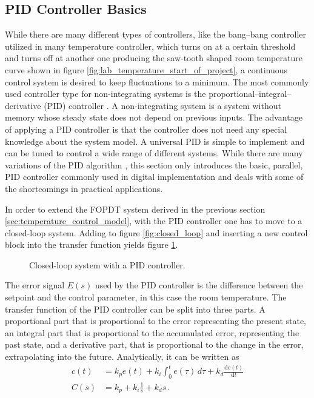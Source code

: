 \subsection{PID Controller Basics}%
\label{sec:pid_controller_basics}
While there are many different types of controllers, like the bang–bang controller utilized in many temperature controller, which turns on at a certain threshold and turns off at another one producing the saw-tooth shaped room temperature curve shown in figure \ref{fig:lab_temperature_start_of_project}, a continuous control system is desired to keep fluctuations to a minimum. The most commonly used controller type for non-integrating systems is the proportional–integral–derivative (PID) controller \cite{pid_in_industry}. A non-integrating system is a system without memory whose steady state does not depend on previous inputs. The advantage of applying a PID controller is that the controller does not need any special knowledge about the system model. A universal PID is simple to implement and can be tuned to control a wide range of different systems. While there are many variations of the PID algorithm \cite{pid_controller}, this section only introduces the basic, parallel, PID controller commonly used in digital implementation and deals with some of the shortcomings in practical applications.

In order to extend the FOPDT system derived in the previous section \ref{sec:temperature_control_model}, with the PID controller one has to move to a closed-loop system. Adding to figure \ref{fig:closed_loop} and inserting a new control block into the transfer function yields figure \ref{fig:closed_loop_pid}.
\begin{figure}[ht]
    \centering
    \caption{Closed-loop system with a PID controller.}
    \label{fig:closed_loop_pid}
\end{figure}

The error signal $E(s)$ used by the PID controller is the difference between the setpoint and the control parameter, in this case the room temperature. The transfer function of the PID controller can be split into three parts. A proportional part that is proportional to the error representing the present state, an integral part that is proportional to the accumulated error, representing the past state, and a derivative part, that is proportional to the change in the error, extrapolating into the future. Analytically, it can be written as
\begin{align}
    c(t) &= k_p e(t) + k_i \int_0^t e(\tau) \,d\tau + k_d \frac{\mathrm{d}e(t)}{\mathrm{d}t} \label{eqn:pid_controller}\\
    C(s) &= k_p + k_i \frac{1}{s} + k_d s \,. \label{eqn:pid_controller_laplace}
\end{align}

